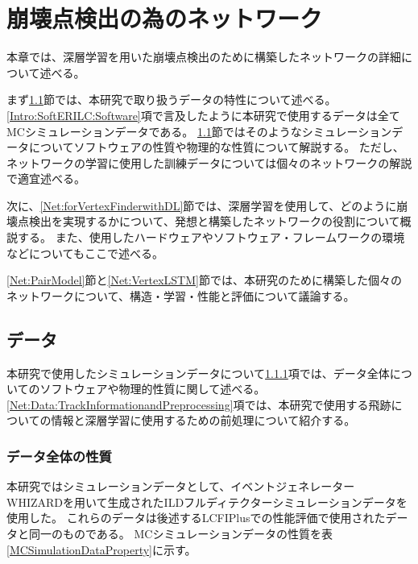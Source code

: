 
\chapter{崩壊点検出の為のネットワーク} \label{chap:Networks}

本章では、深層学習を用いた崩壊点検出のために構築したネットワークの詳細について述べる。

まず\ref{Net:Data}節では、本研究で取り扱うデータの特性について述べる。
\ref{Intro:SoftERILC:Software}項で言及したように本研究で使用するデータは全てMCシミュレーションデータである。
\ref{Net:Data}節ではそのようなシミュレーションデータについてソフトウェアの性質や物理的な性質について解説する。
ただし、ネットワークの学習に使用した訓練データについては個々のネットワークの解説で適宜述べる。

次に、\ref{Net:forVertexFinderwithDL}節では、深層学習を使用して、どのように崩壊点検出を実現するかについて、発想と構築したネットワークの役割について概説する。
また、使用したハードウェアやソフトウェア・フレームワークの環境などについてもここで述べる。

\ref{Net:PairModel}節と\ref{Net:VertexLSTM}節では、本研究のために構築した個々のネットワークについて、構造・学習・性能と評価について議論する。


\section{データ} \label{Net:Data}

本研究で使用したシミュレーションデータについて\ref{Net:Data:DataProperty}項では、データ全体についてのソフトウェアや物理的性質に関して述べる。
\ref{Net:Data:TrackInformationandPreprocessing}項では、本研究で使用する飛跡についての情報と深層学習に使用するための前処理について紹介する。


\subsection{データ全体の性質} \label{Net:Data:DataProperty}

本研究ではシミュレーションデータとして、イベントジェネレーター　WHIZARD\cite{WHIZARDpaper}を用いて生成されたILDフルディテクターシミュレーションデータを使用した。
これらのデータは後述するLCFIPlusでの性能評価\cite{LCFIPlusPaper}で使用されたデータと同一のものである。
MCシミュレーションデータの性質を表\ref{MCSimulationDataProperty}に示す。


